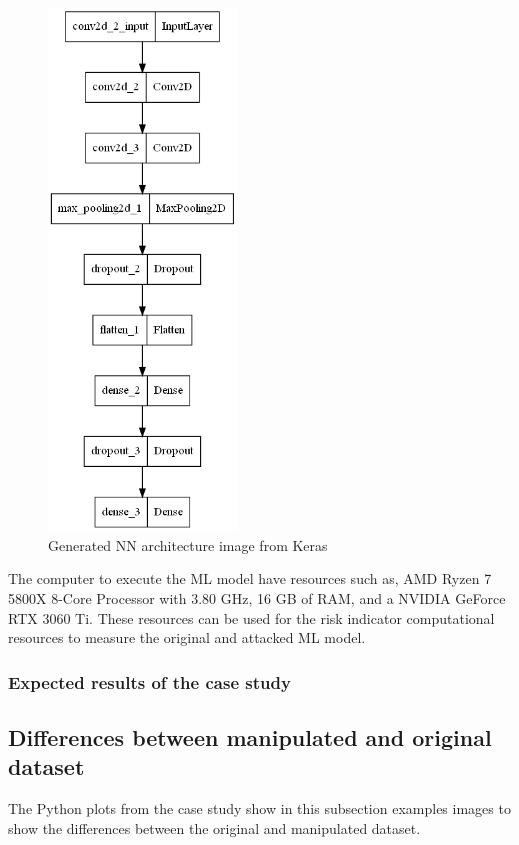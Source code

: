 \begin{figure}[h!]
  \centering
  \includegraphics[width=5cm]{pictures/nn.png}
  \caption{Generated NN architecture image from Keras}
  \label{fig:nn}
\end{figure}

The computer to execute the ML model have resources such as, AMD Ryzen \cite{DBLP:conf/hotchips/AroraBW20} 7 5800X 8-Core Processor with 3.80 GHz, 16 GB of RAM, and a NVIDIA GeForce RTX \cite{DBLP:journals/pcs/SanzharovFG20} 3060 Ti. These resources can be used for the risk indicator computational resources to measure the original and attacked ML model.

\subsubsection*{Expected results of the case study}

\subsection{Differences between manipulated and original dataset}

The Python plots from the case study show in this subsection examples images to show the differences between the original and manipulated dataset.

